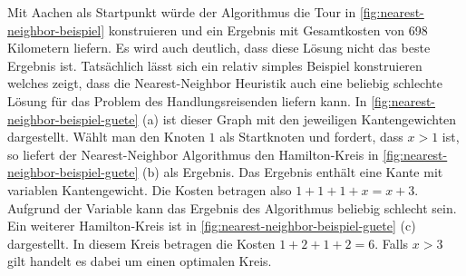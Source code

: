\documentclass{article}
\begin{document}
Mit Aachen als Startpunkt würde der Algorithmus die Tour in \autoref{fig:nearest-neighbor-beispiel} konstruieren und ein Ergebnis mit Gesamtkosten von 698 Kilometern liefern. Es wird auch deutlich, dass diese Lösung nicht das beste Ergebnis ist. Tatsächlich lässt sich ein relativ simples Beispiel konstruieren welches zeigt, dass die Nearest-Neighbor Heuristik auch eine beliebig schlechte Lösung für das Problem des Handlungsreisenden liefern kann. In \autoref{fig:nearest-neighbor-beispiel-guete} (a) ist dieser Graph mit den jeweiligen Kantengewichten dargestellt. Wählt man den Knoten $1$ als Startknoten und fordert, dass $x>1$ ist, so liefert der Nearest-Neighbor Algorithmus den Hamilton-Kreis in \autoref{fig:nearest-neighbor-beispiel-guete} (b) als Ergebnis. Das Ergebnis enthält eine Kante mit variablen Kantengewicht. Die Kosten betragen also $1+1+1+x = x +3$. Aufgrund der Variable kann das Ergebnis des Algorithmus beliebig schlecht sein. Ein weiterer Hamilton-Kreis ist in \autoref{fig:nearest-neighbor-beispiel-guete} (c) dargestellt. In diesem Kreis betragen die Kosten $1+2+1+2 = 6$.
Falls  $x>3$ gilt handelt es dabei um einen optimalen Kreis. 
\end{document}
